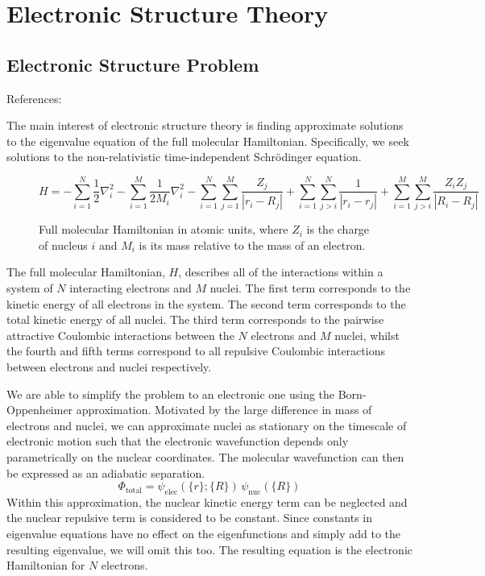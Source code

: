 \section{\label{electronic-structure-theory}Electronic Structure Theory}

\subsection{Electronic Structure Problem}
References: \cite{Atilla1996}

The main interest of electronic structure theory is finding approximate solutions to the eigenvalue equation of the full molecular Hamiltonian. Specifically, we seek solutions to the non-relativistic time-independent Schrödinger equation.
\begin{figure}[H]
\centering
\begin{equation*}
    H =
    - \sum_{i=1}^{N} \frac{1}{2} \nabla^{2}_{i}
    - \sum_{i=1}^{M} \frac{1}{2M_i} \nabla^{2}_{i}
    - \sum_{i=1}^{N} \sum_{j=1}^{M} \frac{Z_j}{|r_{i} - R_{j}|}
    + \sum_{i=1}^{N} \sum_{j>i}^{N} \frac{1}{|r_{i} - r_{j}|}
    + \sum_{i=1}^{M} \sum_{j>i}^{M} \frac{Z_{i} Z_{j}}{|R_{i} - R_{j}|}
\end{equation*}
\caption{Full molecular Hamiltonian in atomic units, where $Z_i$ is the charge of nucleus $i$ and $M_i$ is its mass relative to the mass of an electron.}
\end{figure}
The full molecular Hamiltonian, $H$, describes all of the interactions within a system of $N$ interacting electrons and $M$ nuclei. The first term corresponds to the kinetic energy of all electrons in the system. The second term corresponds to the total kinetic energy of all nuclei. The third term corresponds to the pairwise attractive Coulombic interactions between the $N$ electrons and $M$ nuclei, whilst the fourth and fifth terms correspond to all repulsive Coulombic interactions between electrons and nuclei respectively.

We are able to simplify the problem to an electronic one using the Born-Oppenheimer approximation. Motivated by the large difference in mass of electrons and nuclei, we can approximate nuclei as stationary on the timescale of electronic motion such that the electronic wavefunction depends only parametrically on the nuclear coordinates. The molecular wavefunction can then be expressed as an adiabatic separation.
\begin{equation*}
    \Phi_\text{total} =
    \psi_\text{elec}({\{r\}};\{R\}) \,
    \psi_\text{nuc}(\{R\})
\end{equation*}
Within this approximation, the nuclear kinetic energy term can be neglected and the nuclear repulsive term is considered to be constant. Since constants in eigenvalue equations have no effect on the eigenfunctions and simply add to the resulting eigenvalue, we will omit this too. The resulting equation is the electronic Hamiltonian for $N$ electrons. 

